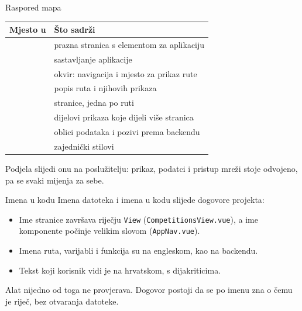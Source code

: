 \begin{frame}{Raspored mapa}
\vspace{0.2em}
\begin{center}
{\small
\setlength{\tabcolsep}{6pt}
\renewcommand{\arraystretch}{1.3}
\begin{tabular}{@{}L{3.5cm}L{7.4cm}@{}}
  \toprule
  \textbf{Mjesto u } & \textbf{Što sadrži} \\
  \midrule
   & prazna stranica s elementom za aplikaciju \\
   & sastavljanje aplikacije \\
   & okvir: navigacija i mjesto za prikaz rute \\
   & popis ruta i njihovih prikaza \\
   & stranice, jedna po ruti \\
   & dijelovi prikaza koje dijeli više stranica \\
   & oblici podataka i pozivi prema backendu \\
   & zajednički stilovi \\
  \bottomrule
\end{tabular}
}
\end{center}

\vspace{0.5em}
Podjela slijedi onu na poslužitelju: prikaz, podatci i pristup mreži stoje odvojeno, pa se svaki mijenja za sebe.
\end{frame}

\begin{frame}{Imena u kodu}
Imena datoteka i imena u kodu slijede dogovore projekta:

\vspace{0.6em}
\begin{konvencija}
\begin{itemize}
  \itemsep0.45em
  \item Ime stranice završava riječju \texttt{View} (\texttt{CompetitionsView.vue}), a ime komponente počinje velikim slovom (\texttt{AppNav.vue}).
  \item Imena ruta, varijabli i funkcija su na engleskom, kao na backendu.
  \item Tekst koji korisnik vidi je na hrvatskom, s dijakriticima.
\end{itemize}
\end{konvencija}

\vspace{0.6em}
Alat nijedno od toga ne provjerava. Dogovor postoji da se po imenu zna o čemu je riječ, bez otvaranja datoteke.
\end{frame}

